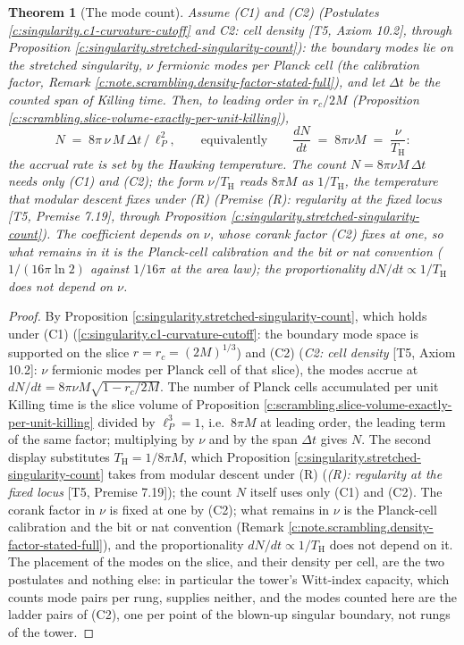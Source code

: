 \documentclass[11pt]{article}
\newtheorem{theorem}{Theorem}[section]
\theoremstyle{definition}
\theoremstyle{plain}
\newcommand{\changedmark}[2]{\marginpar{\raggedright\scriptsize\color{#1}#2}}
\providecommand{\TH}{}\renewcommand{\TH}{T_{\mathrm{H}}}
\providecommand{\lP}{}\renewcommand{\lP}{\ell_{P}}
\begin{document}
\begin{theorem}[The mode count]\label{c:scrambling.mode-count}
\changedmark{BrickRed}{corrected since the deposit}
Assume (C1) and (C2) (Postulates \ref{c:singularity.c1-curvature-cutoff} and \emph{C2: cell density} [T5, Axiom 10.2], through Proposition \ref{c:singularity.stretched-singularity-count}): the boundary modes lie on the stretched singularity, $\nu$ fermionic modes per Planck cell (the calibration factor, Remark \ref{c:note.scrambling.density-factor-stated-full}), and let $\Delta t$ be the counted span of Killing time. Then, to leading order in $r_c/2M$ (Proposition \ref{c:scrambling.slice-volume-exactly-per-unit-killing}),
\[
N \;=\; 8\pi\,\nu\,M\,\Delta t\,/\,\lP^2,
\qquad\text{equivalently}\qquad
\frac{dN}{dt} \;=\; 8\pi\nu M \;=\; \frac{\nu}{\TH}:
\]
the accrual rate is set by the Hawking temperature. The count $N = 8\pi\nu M\,\Delta t$ needs only (C1) and (C2); the form $\nu/\TH$ reads $8\pi M$ as $1/\TH$, the temperature that modular descent fixes under (R) (Premise \emph{(R): regularity at the fixed locus} [T5, Premise 7.19], through Proposition \ref{c:singularity.stretched-singularity-count}). The coefficient depends on $\nu$, whose corank factor (C2) fixes at one, so what remains in it is the Planck-cell calibration and the bit or nat convention ($1/(16\pi\ln 2)$ against $1/16\pi$ at the area law); the proportionality $dN/dt \propto 1/\TH$ does not depend on $\nu$.
\end{theorem}
\begin{proof}
By Proposition \ref{c:singularity.stretched-singularity-count}, which holds under (C1) (\ref{c:singularity.c1-curvature-cutoff}: the boundary mode space is supported on the slice $r = r_c = (2M)^{1/3}$) and (C2) (\emph{C2: cell density} [T5, Axiom 10.2]: $\nu$ fermionic modes per Planck cell of that slice), the modes accrue at $dN/dt = 8\pi\nu M\sqrt{1 - r_c/2M}$. The number of Planck cells accumulated per unit Killing time is the slice volume of Proposition \ref{c:scrambling.slice-volume-exactly-per-unit-killing} divided by $\lP^3 = 1$, i.e.\ $8\pi M$ at leading order, the leading term of the same factor; multiplying by $\nu$ and by the span $\Delta t$ gives $N$. The second display substitutes $\TH = 1/8\pi M$, which Proposition \ref{c:singularity.stretched-singularity-count} takes from modular descent under (R) (\emph{(R): regularity at the fixed locus} [T5, Premise 7.19]); the count $N$ itself uses only (C1) and (C2). The corank factor in $\nu$ is fixed at one by (C2); what remains in $\nu$ is the Planck-cell calibration and the bit or nat convention (Remark \ref{c:note.scrambling.density-factor-stated-full}), and the proportionality $dN/dt \propto 1/\TH$ does not depend on it. The placement of the modes on the slice, and their density per cell, are the two postulates and nothing else: in particular the tower's Witt-index capacity, which counts mode pairs per rung, supplies neither, and the modes counted here are the ladder pairs of (C2), one per point of the blown-up singular boundary, not rungs of the tower.

\end{proof}
\end{document}
